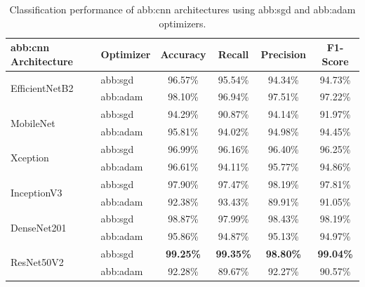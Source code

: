 \begin{table}[H]
    \centering
    \renewcommand{\arraystretch}{1.4}
    \setlength{\tabcolsep}{10pt}
    \caption{Classification performance of \gls{abb:cnn} architectures using \gls{abb:sgd} and \gls{abb:adam} optimizers.}
    \label{tab:cnn_performance}
    \begin{tabular}{|p{4cm}|p{2cm}|c|c|c|c|}
        \hline
        \textbf{\gls{abb:cnn} Architecture} & \textbf{Optimizer} & \textbf{Accuracy} & \textbf{Recall} & \textbf{Precision} & \textbf{F1-Score} \\ \hline

        \multirow{2}{*}{EfficientNetB2} 
        & \gls{abb:sgd}  & 96.57\% & 95.54\% & 94.34\% & 94.73\% \\ \cline{2-6}
        & \gls{abb:adam} & 98.10\% & 96.94\% & 97.51\% & 97.22\% \\ \hline

        \multirow{2}{*}{MobileNet} 
        & \gls{abb:sgd}  & 94.29\% & 90.87\% & 94.14\% & 91.97\% \\ \cline{2-6}
        & \gls{abb:adam} & 95.81\% & 94.02\% & 94.98\% & 94.45\% \\ \hline

        \multirow{2}{*}{Xception} 
        & \gls{abb:sgd}  & 96.99\% & 96.16\% & 96.40\% & 96.25\% \\ \cline{2-6}
        & \gls{abb:adam} & 96.61\% & 94.11\% & 95.77\% & 94.86\% \\ \hline

        \multirow{2}{*}{InceptionV3} 
        & \gls{abb:sgd}  & 97.90\% & 97.47\% & 98.19\% & 97.81\% \\ \cline{2-6}
        & \gls{abb:adam} & 92.38\% & 93.43\% & 89.91\% & 91.05\% \\ \hline

        \multirow{2}{*}{DenseNet201} 
        & \gls{abb:sgd}  & 98.87\% & 97.99\% & 98.43\% & 98.19\% \\ \cline{2-6}
        & \gls{abb:adam} & 95.86\% & 94.87\% & 95.13\% & 94.97\% \\ \hline

        \multirow{2}{*}{ResNet50V2} 
        & \gls{abb:sgd}  & \textbf{99.25\%} & \textbf{99.35\%} & \textbf{98.80\%} & \textbf{99.04\%} \\ \cline{2-6}
        & \gls{abb:adam} & 92.28\% & 89.67\% & 92.27\% & 90.57\% \\ \hline
    \end{tabular}
\end{table}

